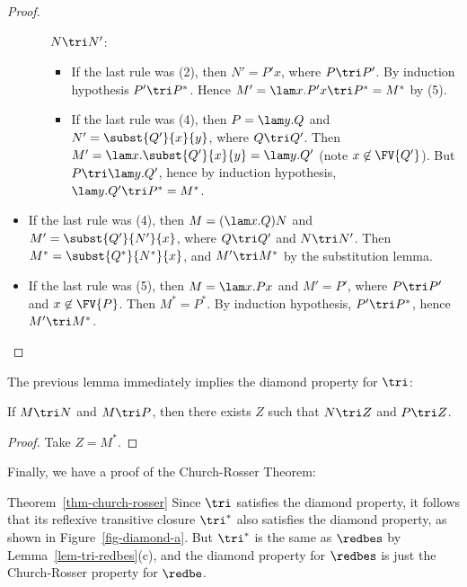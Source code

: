 \documentclass[12pt]{article}
\begin{document}
\begin{proof}
\begin{itemize}
\begin{itemize}
      $N\tri N'$:
      \begin{itemize}
      \item If the last rule was (2), then $N' = P'x$, where $P\tri
        P'$. By induction hypothesis $P' \tri P^*$.  Hence $M' = \lam
        x.P'x \tri P^* = M^*$ by (5).
      \item If the last rule was (4), then $P = \lam y.Q$ and $N' =
        \subst{Q'}{x}{y}$, where $Q\tri Q'$. Then $M' = \lam
        x.\subst{Q'}{x}{y} = \lam y.Q'$ (note $x \not\in \FV{Q'}$).
        But $P \tri \lam y.Q'$, hence by induction hypothesis, $\lam
        y.Q' \tri P^* = M^*$.
      \end{itemize}
    \end{itemize}
  \item If the last rule was (4), then $M = (\lam x.Q)N$ and $M' =
    \subst{Q'}{N'}{x}$, where $Q\tri Q'$ and $N\tri N'$. Then $M^* =
    \subst{Q^*}{N^*}{x}$, and $M' \tri M^*$ by the substitution lemma.
  \item If the last rule was (5), then $M = \lam x.Px$ and $M' = P'$,
    where $P\tri P'$ and $x\not\in\FV{P}$. Then $M^*=P^*$. By
    induction hypothesis, $P'\tri P^*$, hence $M'\tri M^*$.  \eot
  \end{itemize}
\end{proof}

The previous lemma immediately implies the diamond property for
$\tri$:

\begin{lemma}
  If $M\tri N$ and $M\tri P$, then there exists $Z$ such that $N\tri
  Z$ and $P\tri Z$. 
\end{lemma}

\begin{proof}
  Take $Z=M^*$.\eot
\end{proof}

Finally, we have a proof of the Church-Rosser Theorem:

\begin{proofof}{Theorem~\ref{thm-church-rosser}}
  Since $\tri$ satisfies the diamond property, it follows that its
  reflexive transitive closure $\tri^*$ also satisfies the diamond
  property, as shown in Figure~\ref{fig-diamond-a}. But $\tri^*$ is the same
  as $\redbes$ by Lemma~\ref{lem-tri-redbes}(c), and the diamond property for
  $\redbes$ is just the Church-Rosser property for $\redbe$.\eot
\end{proofof}

\end{document}
